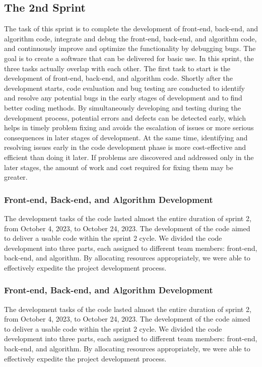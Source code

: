 \documentclass[journal]{IEEEtran}
\begin{document}
\subsection{The 2nd Sprint}
\label{sec:sprint2}
The task of this sprint is to complete the development of front-end, back-end, and algorithm code, integrate and debug the front-end, back-end, and algorithm code, and continuously improve and optimize the functionality by debugging bugs. The goal is to create a software that can be delivered for basic use. In this sprint, the three tasks actually overlap with each other. The first task to start is the development of front-end, back-end, and algorithm code. Shortly after the development starts, code evaluation and bug testing are conducted to identify and resolve any potential bugs in the early stages of development and to find better coding methods. By simultaneously developing and testing during the development process, potential errors and defects can be detected early, which helps in timely problem fixing and avoids the escalation of issues or more serious consequences in later stages of development. At the same time, identifying and resolving issues early in the code development phase is more cost-effective and efficient than doing it later. If problems are discovered and addressed only in the later stages, the amount of work and cost required for fixing them may be greater.

\subsubsection{Front-end, Back-end, and Algorithm Development}
The development tasks of the code lasted almost the entire duration of sprint 2, from October 4, 2023, to October 24, 2023. The development of the code aimed to deliver a usable code within the sprint 2 cycle. We divided the code development into three parts, each assigned to different team members: front-end, back-end, and algorithm. By allocating resources appropriately, we were able to effectively expedite the project development process. 

\subsubsection{Front-end, Back-end, and Algorithm Development}
The development tasks of the code lasted almost the entire duration of sprint 2, from October 4, 2023, to October 24, 2023. The development of the code aimed to deliver a usable code within the sprint 2 cycle. We divided the code development into three parts, each assigned to different team members: front-end, back-end, and algorithm. By allocating resources appropriately, we were able to effectively expedite the project development process.
\end{document}
